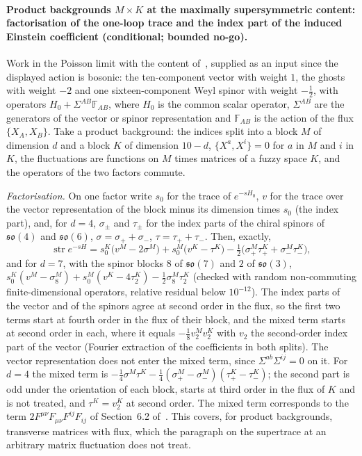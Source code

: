 \paragraph{Product backgrounds \(M\times K\) at the maximally supersymmetric content: factorisation of the one-loop trace and the index part of the induced Einstein coefficient (conditional; bounded no-go).}
Work in the Poisson limit with the content of~\cite{IKKT1997}, supplied as an input since the displayed action is bosonic: the ten-component vector with weight \(1\), the ghosts with weight \(-2\) and one sixteen-component Weyl spinor with weight \(-\tfrac12\), with operators \(H_0+\Sigma^{AB}\mathbb F_{AB}\), where \(H_0\) is the common scalar operator, \(\Sigma^{AB}\) are the generators of the vector or spinor representation and \(\mathbb F_{AB}\) is the action of the flux \(\{X_A,X_B\}\). Take a product background: the indices split into a block \(M\) of dimension \(d\) and a block \(K\) of dimension \(10-d\), \(\{X^a,X^i\}=0\) for \(a\) in \(M\) and \(i\) in \(K\), the fluctuations are functions on \(M\) times matrices of a fuzzy space \(K\), and the operators of the two factors commute.

\emph{Factorisation.} On one factor write \(s_0\) for the trace of \(e^{-sH_0}\), \(v\) for the trace over the vector representation of the block minus its dimension times \(s_0\) (the index part), and, for \(d=4\), \(\sigma_\pm\) and \(\tau_\pm\) for the index parts of the chiral spinors of \(\mathfrak{so}(4)\) and \(\mathfrak{so}(6)\), \(\sigma=\sigma_++\sigma_-\), \(\tau=\tau_++\tau_-\). Then, exactly,
\[
  \operatorname{str}e^{-sH}=s_0^K\bigl(v^M-2\sigma^M\bigr)+s_0^M\bigl(v^K-\tau^K\bigr)-\tfrac12\bigl(\sigma_+^M\tau_+^K+\sigma_-^M\tau_-^K\bigr),
\]
and for \(d=7\), with the spinor blocks \(8\) of \(\mathfrak{so}(7)\) and \(2\) of \(\mathfrak{so}(3)\), \(s_0^K(v^M-\sigma_8^M)+s_0^M(v^K-4\tau_2^K)-\tfrac12\sigma_8^M\tau_2^K\) (checked with random non-commuting finite-dimensional operators, relative residual below \(10^{-12}\)). The index parts of the vector and of the spinors agree at second order in the flux, so the first two terms start at fourth order in the flux of their block, and the mixed term starts at second order in each, where it equals \(-\tfrac18v_2^Mv_2^K\) with \(v_2\) the second-order index part of the vector (Fourier extraction of the coefficients in both splits). The vector representation does not enter the mixed term, since \(\Sigma^{ab}\Sigma^{ij}=0\) on it. For \(d=4\) the mixed term is \(-\tfrac14\sigma^M\tau^K-\tfrac14(\sigma_+^M-\sigma_-^M)(\tau_+^K-\tau_-^K)\); the second part is odd under the orientation of each block, starts at third order in the flux of \(K\) and is not treated, and \(\tau^K=v_2^K\) at second order. The mixed term corresponds to the term \(2F^{\mu\nu}F_{\mu\nu}F^{ij}F_{ij}\) of Section~6.2 of~\cite{Steinacker2023}. This covers, for product backgrounds, transverse matrices with flux, which the paragraph on the supertrace at an arbitrary matrix fluctuation does not treat.

